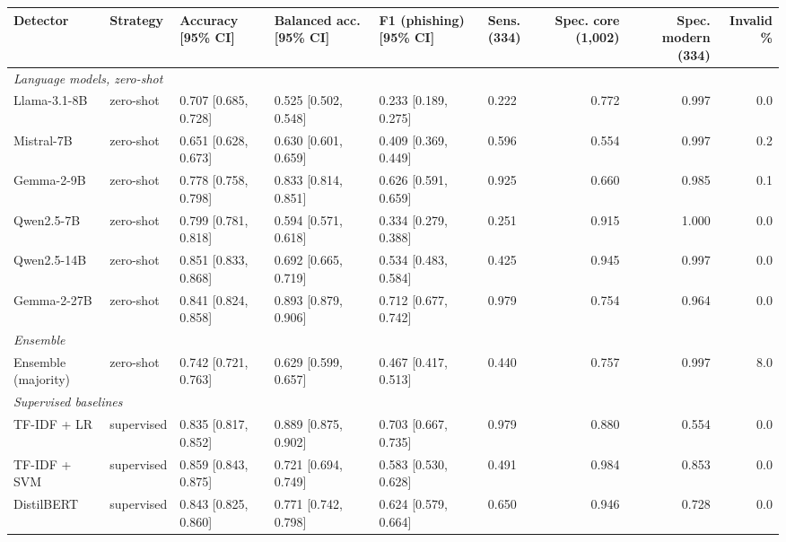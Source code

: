 \begin{tabular}{llllllrrr}
\toprule
Detector & Strategy & Accuracy [95\% CI] & Balanced acc. [95\% CI] & F1 (phishing) [95\% CI] & Sens. (334) & Spec. core (1,002) & Spec. modern (334) & Invalid \% \\
\midrule
\multicolumn{9}{l}{\textit{Language models, zero-shot}} \\
Llama-3.1-8B & zero-shot & 0.707 [0.685, 0.728] & 0.525 [0.502, 0.548] & 0.233 [0.189, 0.275] & 0.222 & 0.772 & 0.997 & 0.0 \\
Mistral-7B & zero-shot & 0.651 [0.628, 0.673] & 0.630 [0.601, 0.659] & 0.409 [0.369, 0.449] & 0.596 & 0.554 & 0.997 & 0.2 \\
Gemma-2-9B & zero-shot & 0.778 [0.758, 0.798] & 0.833 [0.814, 0.851] & 0.626 [0.591, 0.659] & 0.925 & 0.660 & 0.985 & 0.1 \\
Qwen2.5-7B & zero-shot & 0.799 [0.781, 0.818] & 0.594 [0.571, 0.618] & 0.334 [0.279, 0.388] & 0.251 & 0.915 & 1.000 & 0.0 \\
Qwen2.5-14B & zero-shot & 0.851 [0.833, 0.868] & 0.692 [0.665, 0.719] & 0.534 [0.483, 0.584] & 0.425 & 0.945 & 0.997 & 0.0 \\
Gemma-2-27B & zero-shot & 0.841 [0.824, 0.858] & 0.893 [0.879, 0.906] & 0.712 [0.677, 0.742] & 0.979 & 0.754 & 0.964 & 0.0 \\
\midrule
\multicolumn{9}{l}{\textit{Ensemble}} \\
Ensemble (majority) & zero-shot & 0.742 [0.721, 0.763] & 0.629 [0.599, 0.657] & 0.467 [0.417, 0.513] & 0.440 & 0.757 & 0.997 & 8.0 \\
\midrule
\multicolumn{9}{l}{\textit{Supervised baselines}} \\
TF-IDF + LR & supervised & 0.835 [0.817, 0.852] & 0.889 [0.875, 0.902] & 0.703 [0.667, 0.735] & 0.979 & 0.880 & 0.554 & 0.0 \\
TF-IDF + SVM & supervised & 0.859 [0.843, 0.875] & 0.721 [0.694, 0.749] & 0.583 [0.530, 0.628] & 0.491 & 0.984 & 0.853 & 0.0 \\
DistilBERT & supervised & 0.843 [0.825, 0.860] & 0.771 [0.742, 0.798] & 0.624 [0.579, 0.664] & 0.650 & 0.946 & 0.728 & 0.0 \\
\bottomrule
\end{tabular}
